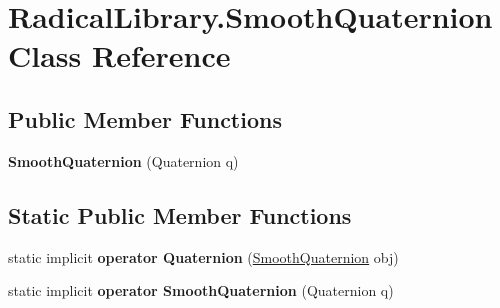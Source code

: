 \hypertarget{class_radical_library_1_1_smooth_quaternion}{}\section{Radical\+Library.\+Smooth\+Quaternion Class Reference}
\label{class_radical_library_1_1_smooth_quaternion}
\subsection*{Public Member Functions}
\begin{DoxyCompactItemize}
\item 
\mbox{\label{class_radical_library_1_1_smooth_quaternion_aae3b7898e4f71eb1540fd0d31c2b7e72}} 
{\bfseries Smooth\+Quaternion} (Quaternion q)
\end{DoxyCompactItemize}
\subsection*{Static Public Member Functions}
\begin{DoxyCompactItemize}
\item 
\mbox{\label{class_radical_library_1_1_smooth_quaternion_a8ff1a27e2ca9ca02514e311abb4808f0}} 
static implicit {\bfseries operator Quaternion} (\hyperlink{class_radical_library_1_1_smooth_quaternion}{Smooth\+Quaternion} obj)
\item 
\mbox{\label{class_radical_library_1_1_smooth_quaternion_a08a76bbeb19fdfadcf3d092b8f86030d}} 
static implicit {\bfseries operator Smooth\+Quaternion} (Quaternion q)
\end{DoxyCompactItemize}

